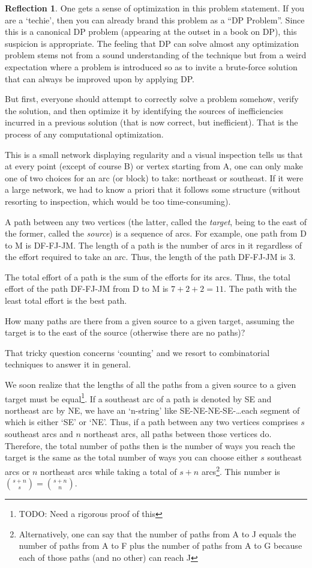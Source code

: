 \documentclass[english,notitlepage,smartquotes]{hgbreport}
\theoremstyle{definition}
\theoremstyle{definition}
\theoremstyle{remark}
\theoremstyle{definition}
\theoremstyle{plain}
\theoremstyle{definition}
\newtheorem{reflection}{Reflection}
\begin{document}
\begin{reflection}
One gets a sense of optimization in this problem statement. If you are a `techie', then you can already brand this problem as a ``DP Problem''. Since this is a canonical DP problem (appearing at the outset in a book on DP), this suspicion is appropriate. The feeling that DP can solve almost any optimization problem stems not from a sound understanding of the technique but from a weird expectation where a problem is introduced so as to invite a brute-force solution that can always be improved upon by applying DP.

But first, everyone should attempt to correctly solve a problem somehow, verify the solution, and then optimize it by identifying the sources of inefficiencies incurred in a previous solution (that is now correct, but inefficient). That is the process of any computational optimization.
\end{reflection}


This is a small network displaying regularity and a visual inspection tells us that at every point (except of course B) or vertex starting from A, one can only make one of two choices for an arc (or block) to take: northeast or southeast. If it were a large network, we had to know a priori that it follows some structure (without resorting to inspection, which would be too time-consuming). 

A path between any two vertices (the latter, called the \emph{target}, being to the east of the former, called the \emph{source}) is a sequence of arcs. For example, one path from D to M is DF-FJ-JM. The length of a path is the number of arcs in it regardless of the effort required to take an arc. Thus, the length of the path DF-FJ-JM is 3.

The total effort of a path is the sum of the efforts for its arcs. Thus, the total effort of the path DF-FJ-JM from D to M is $7+2+2=11$. The path with the least total effort is the best path. 

How many paths are there from a given source to a given target, assuming the target is to the east of the source (otherwise there are no paths)?   

That tricky question concerns `counting' and we resort to combinatorial techniques to answer it in general. 

We soon realize that the lengths of all the paths from a given source to a given target must be equal\footnote{TODO: Need a rigorous proof of this}. If a southeast arc of a path is denoted by SE and northeast arc by NE, we have an `n-string' like SE-NE-NE-SE-\dots each segment of which is either `SE' or `NE'. Thus, if a path between any two vertices comprises $s$ southeast arcs and $n$ northeast arcs, all paths between those vertices do. Therefore, the total number of paths then is the number of ways you reach the target is the same as the total number of ways you can choose either $s$ southeast arcs or $n$ northeast arcs while taking a total of $s+n$ arcs\footnote{Alternatively, one can say that the number of paths from A to J equals the number of paths from A to F plus the number of paths from A to G because each of those paths (and no other) can reach J}. This number is ${s+n\choose s}={s+n\choose n}$.
\end{document}
